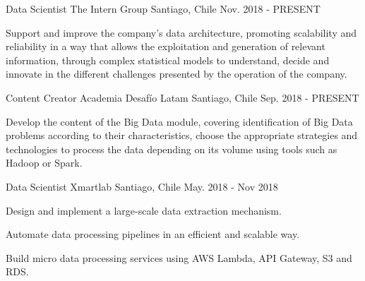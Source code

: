 

\begin{cventries}

  \cventry
    {Data Scientist} %
    {The Intern Group} %
    {Santiago, Chile} %
    {Nov. 2018 - PRESENT} %
    {
      \begin{cvitems} %
        \item {Support and improve the company's data architecture, promoting scalability and reliability in a way that allows the exploitation and generation of relevant information, through complex statistical models to understand, decide and innovate in the different challenges presented by the operation of the company.}
      \end{cvitems}
    }
  \cventry
    {Content Creator} %
    {Academia Desafío Latam} %
    {Santiago, Chile} %
    {Sep. 2018 - PRESENT} %
    {
      \begin{cvitems} %
        \item {Develop the content of the Big Data module, covering identification of Big Data problems according to their characteristics, choose the appropriate strategies and technologies to process the data depending on its volume using tools such as Hadoop or Spark.}
      \end{cvitems}
    }
  \cventry
    {Data Scientist} %
    {Xmartlab} %
    {Santiago, Chile} %
    {May. 2018 - Nov 2018} %
    {
      \begin{cvitems} %
        \item {Design and implement a large-scale data extraction mechanism.}
        \item {Automate data processing pipelines in an efficient and scalable way.}
        \item {Build micro data processing services using AWS Lambda, API Gateway, S3 and RDS.}

\end{cvitems}}
\end{cventries}
